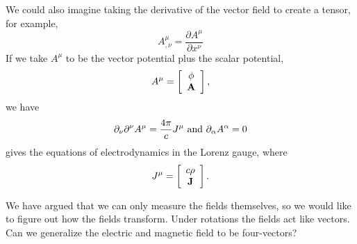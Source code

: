 We could also imagine taking the derivative of the vector field to create a tensor, 
for example,
\begin{equation}
A^{\mu}_{,\nu} = \frac{\partial A^\mu}{\partial x^{\nu}}
\label{eq:302}
\end{equation}
If we take $A^{\mu}$ to be the vector potential plus the scalar
potential,
\begin{equation}
A^\mu = \left [ \begin{array}{c}
\phi \\ {\bf A} \end{array} \right ],
\end{equation}
we have
\begin{equation}
\partial_\nu \partial^\nu A^{\mu} = \frac{4 \pi}{c} J^\mu~\hbox{\rm and}~\partial_\alpha A^\alpha = 0 
\label{eq:303}
\end{equation}
gives the equations of electrodynamics in the Lorenz gauge, where
\begin{equation}
J^\mu = \left [ \begin{array}{c}
c \rho \\ {\bf J} \end{array} \right ].
\end{equation}

We have argued that we can only measure the fields themselves, so we
would like to figure out how the fields transform.  Under rotations
the fields act like vectors.  Can we generalize the electric and
magnetic field to be four-vectors?

